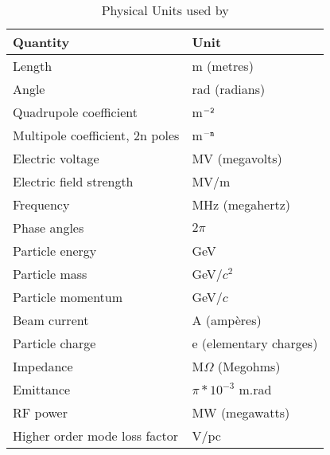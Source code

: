 \begin{table}[ht]
  \caption{Physical Units used by \madx}
  \vspace{1ex}
  \centering  
  \begin{tabular}{|l|l|}
    \hline
    \textbf{Quantity}       & \textbf{Unit} \\
    \hline
    Length                  & m (metres) \\ 
    Angle                   & rad (radians) \\ 
    Quadrupole coefficient  & m$^{\tt{-2}}$ \\ 
    Multipole coefficient, 2n poles   & m$^{\tt{-n}}$ \\ 
    Electric voltage        & MV (megavolts) \\ 
    Electric field strength & MV/m \\ 
    Frequency               & MHz (megahertz) \\ 
    Phase angles            & $2\pi$ \\ 
    Particle energy         & GeV \\ 
    Particle mass           & GeV/$c^2$ \\ 
    Particle momentum       & GeV/$c$ \\ 
    Beam current            & A (amp\`eres) \\ 
    Particle charge         & e (elementary charges) \\ 
    Impedance               & M$\Omega$ (Megohms) \\ 
    Emittance               & $\pi * 10^{-3}$ m.rad \\ %
    RF power                & MW (megawatts) \\ 
    Higher order mode loss factor & V/pc \\
    \hline
  \end{tabular}
\end{table}

